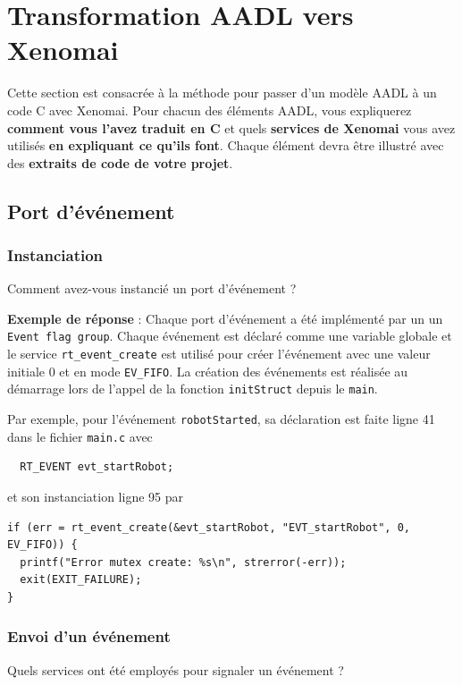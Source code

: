 \documentclass[11pt, a4paper]{paper}
\begin{document}
\newpage


\section{Transformation AADL vers Xenomai}
 
 {\color{red} Cette section est consacrée à la méthode pour passer d'un modèle AADL à un code C avec Xenomai. Pour chacun des éléments AADL, vous expliquerez {\bf comment vous l'avez traduit en C} et quels {\bf services de Xenomai} vous avez utilisés {\bf en expliquant ce qu'ils font}. Chaque élément devra être illustré avec des {\bf extraits de code de votre projet}.}
 
\subsection{Port d’événement}

\subsubsection{Instanciation}
 {\color{blue} Comment avez-vous instancié un port d'événement ?}\\
 
  
{\color{blue} {\bf Exemple de réponse} : Chaque port d'événement a été implémenté par un un {\tt Event flag group}. Chaque événement est déclaré comme une variable globale et le service {\tt rt\_event\_create} est utilisé pour créer l'événement avec une valeur initiale 0 et en mode {\tt EV\_FIFO}. 
La création des événements est réalisée au démarrage lors de l'appel de la fonction {\tt initStruct} depuis le {\tt main}. 

Par exemple, pour l'événement {\tt robotStarted}, sa déclaration est faite ligne 41 dans le fichier {\tt main.c} avec
\begin{verbatim}
  RT_EVENT evt_startRobot;
\end{verbatim}
et son instanciation ligne 95 par 
\begin{verbatim}
if (err = rt_event_create(&evt_startRobot, "EVT_startRobot", 0, EV_FIFO)) {
  printf("Error mutex create: %s\n", strerror(-err));
  exit(EXIT_FAILURE);
}
\end{verbatim}
}
\subsubsection{Envoi d’un événement}
 {\color{blue} Quels services ont été employés pour signaler un événement ?}
\end{document}
